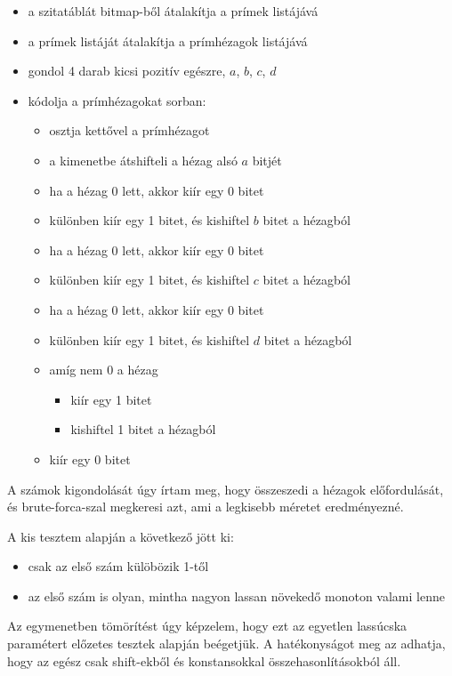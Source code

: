 \documentclass{article}
\begin{document}
\begin{itemize}
\item a szitatáblát bitmap-ből átalakítja a prímek listájává
\item a prímek listáját átalakítja a prímhézagok listájává
\item gondol 4 darab kicsi pozitív egészre, $a$, $b$, $c$, $d$
\item kódolja a prímhézagokat sorban:
\begin{itemize}
\item osztja kettővel a prímhézagot
\item a kimenetbe átshifteli a hézag alsó $a$ bitjét
\item ha a hézag 0 lett, akkor kiír egy 0 bitet
\item különben kiír egy 1 bitet, és kishiftel $b$ bitet a hézagból
\item ha a hézag 0 lett, akkor kiír egy 0 bitet
\item különben kiír egy 1 bitet, és kishiftel $c$ bitet a hézagból
\item ha a hézag 0 lett, akkor kiír egy 0 bitet
\item különben kiír egy 1 bitet, és kishiftel $d$ bitet a hézagból
\item amíg nem 0 a hézag
\begin{itemize}
\item kiír egy 1 bitet
\item kishiftel 1 bitet a hézagból
\end{itemize}
\item kiír egy 0 bitet
\end{itemize}
\end{itemize}

A számok kigondolását úgy írtam meg, hogy összeszedi a hézagok előfordulását, és brute-forca-szal megkeresi azt, ami a legkisebb méretet eredményezné.

A kis tesztem alapján a következő jött ki:
\begin{itemize}
\item csak az első szám külöbözik 1-től
\item az első szám is olyan, mintha nagyon lassan növekedő monoton valami lenne
\end{itemize}

Az egymenetben tömörítést úgy képzelem, hogy ezt az egyetlen lassúcska paramétert előzetes tesztek alapján beégetjük. A hatékonyságot meg az adhatja, hogy az egész csak shift-ekből és konstansokkal összehasonlításokból áll.
\end{document}
